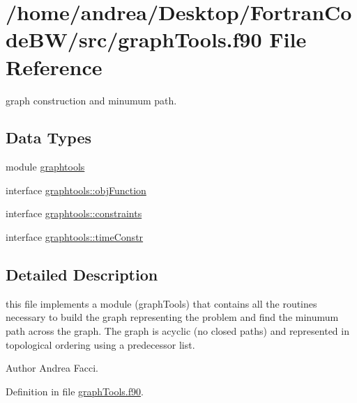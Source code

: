 \hypertarget{graph_tools_8f90}{\section{/home/andrea/\-Desktop/\-Fortran\-Code\-B\-W/src/graph\-Tools.f90 File Reference}
\label{graph_tools_8f90}
}


graph construction and minumum path.  


\subsection*{Data Types}
\begin{DoxyCompactItemize}
\item 
module \hyperlink{classgraphtools}{graphtools}
\item 
interface \hyperlink{interfacegraphtools_1_1obj_function}{graphtools\-::obj\-Function}
\item 
interface \hyperlink{interfacegraphtools_1_1constraints}{graphtools\-::constraints}
\item 
interface \hyperlink{interfacegraphtools_1_1time_constr}{graphtools\-::time\-Constr}
\end{DoxyCompactItemize}


\subsection{Detailed Description}
this file implements a module (graph\-Tools) that contains all the routines necessary to build the graph representing the problem and find the minumum path across the graph. The graph is acyclic (no closed paths) and represented in topological ordering using a predecessor list. \begin{DoxyAuthor}{Author}
Andrea Facci. 
\end{DoxyAuthor}


Definition in file \hyperlink{graph_tools_8f90_source}{graph\-Tools.\-f90}.

